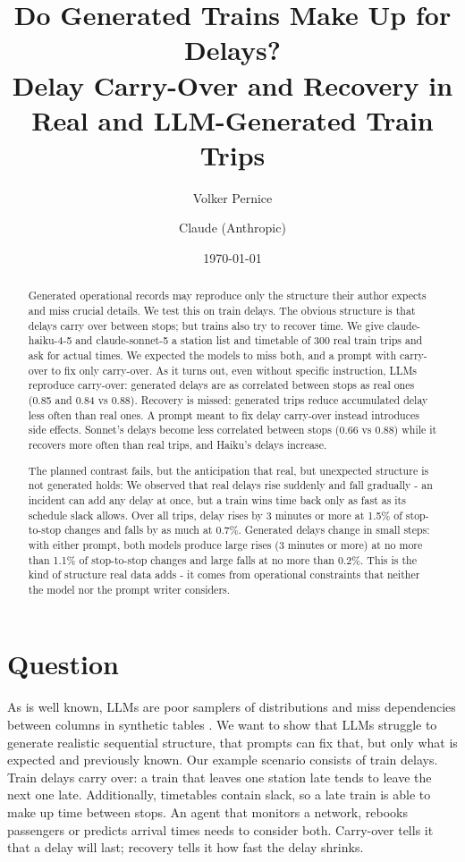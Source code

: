 \documentclass[11pt,a4paper]{article}
\title{Do Generated Trains Make Up for Delays?\\
\large Delay Carry-Over and Recovery in Real and LLM-Generated Train Trips}
\author{Volker Pernice \and Claude (Anthropic)}
\date{\today}
\begin{document}
\maketitle

\begin{abstract}
Generated operational records may reproduce only the structure their author expects and miss crucial details. We test this on train delays. The obvious structure is that delays carry over between stops; but trains also try to recover time. We give claude-haiku-4-5 and claude-sonnet-5 a station list and timetable of 300 real train trips and ask for actual times. We expected the models to miss both, and a prompt with carry-over to fix only carry-over. As it turns out, even without specific instruction, LLMs reproduce carry-over: generated delays are as correlated between stops as real ones (0.85 and 0.84 vs 0.88). Recovery is missed: generated trips reduce accumulated delay less often than real ones. A prompt meant to fix delay carry-over instead introduces side effects. Sonnet's delays become less correlated between stops (0.66 vs 0.88) while it recovers more often than real trips, and Haiku's delays increase.

 The planned contrast fails, but the anticipation that real, but unexpected structure is not generated holds: We observed that real delays rise suddenly and fall gradually - an incident can add any delay at once, but a train wins time back only as fast as its schedule slack allows. Over all trips, delay rises by 3 minutes or more at 1.5\% of stop-to-stop changes and falls by as much at 0.7\%. Generated delays change in small steps: with either prompt, both models produce large rises (3 minutes or more) at no more than 1.1\% of stop-to-stop changes and large falls at no more than 0.2\%. This is the kind of structure real data adds - it comes from operational constraints that neither the model nor the prompt writer considers.
\end{abstract}

\section{Question}
As is well known, LLMs are poor samplers of distributions \citep{zhang2024forcing,zhao2026dice} and miss dependencies between columns in synthetic tables \citep{xu2024tables}. We want to show that LLMs struggle to generate realistic sequential structure, that prompts can fix that, but only what is expected and previously known. Our example scenario consists of train delays. 
Train delays carry over: a train that leaves one station late tends to leave the next one late. Additionally, timetables contain slack, so a late train is able to make up time between stops. An agent that monitors a network, rebooks passengers or predicts arrival times needs to consider both. Carry-over tells it that a delay will last; recovery tells it how fast the delay shrinks.
\end{document}

